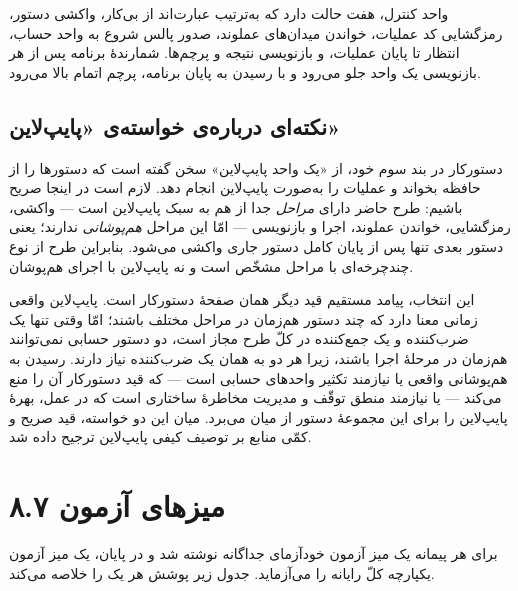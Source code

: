 \documentclass[12pt,a4paper]{article}
\begin{document}

	واحد کنترل، هفت حالت دارد که به‌ترتیب عبارت‌اند از بی‌کار، واکشی دستور، رمزگشایی کد عملیات، خواندن میدان‌های عملوند، صدور پالس شروع به واحد حساب، انتظار تا پایان عملیات، و بازنویسی نتیجه و پرچم‌ها. شمارندهٔ برنامه پس از هر بازنویسی یک واحد جلو می‌رود و با رسیدن به پایان برنامه، پرچم اتمام بالا می‌رود.


	\subsection*{نکته‌ای درباره‌ی خواسته‌ی «پایپ‌لاین»}
	دستورکار در بند سوم خود، از «یک واحد پایپ‌لاین» سخن گفته است که دستورها را از حافظه بخواند و عملیات را به‌صورت پایپ‌لاین انجام دهد. لازم است در اینجا صریح باشیم: طرح حاضر دارای \emph{مراحل} جدا از هم به سبک پایپ‌لاین است --- واکشی، رمزگشایی، خواندن عملوند، اجرا و بازنویسی --- امّا این مراحل \emph{هم‌پوشانی} ندارند؛ یعنی دستور بعدی تنها پس از پایان کامل دستور جاری واکشی می‌شود. بنابراین طرح از نوع چندچرخه‌ای با مراحل مشخّص است و نه پایپ‌لاین با اجرای هم‌پوشان.

	این انتخاب، پیامد مستقیم قید دیگر همان صفحهٔ دستورکار است. پایپ‌لاین واقعی زمانی معنا دارد که چند دستور هم‌زمان در مراحل مختلف باشند؛ امّا وقتی تنها یک ضرب‌کننده و یک جمع‌کننده در کلّ طرح مجاز است، دو دستور حسابی نمی‌توانند هم‌زمان در مرحلهٔ اجرا باشند، زیرا هر دو به همان یک ضرب‌کننده نیاز دارند. رسیدن به هم‌پوشانی واقعی یا نیازمند تکثیر واحدهای حسابی است --- که قید دستورکار آن را منع می‌کند --- یا نیازمند منطق توقّف و مدیریت مخاطرهٔ ساختاری است که در عمل، بهرهٔ پایپ‌لاین را برای این مجموعهٔ دستور از میان می‌برد. میان این دو خواسته، قید صریح و کمّی منابع بر توصیف کیفی پایپ‌لاین ترجیح داده شد.

	\section*{۸.۷ میزهای آزمون}
	برای هر پیمانه یک میز آزمون خودآزمای جداگانه نوشته شد و در پایان، یک میز آزمون یکپارچه کلّ رایانه را می‌آزماید. جدول زیر پوشش هر یک را خلاصه می‌کند.
\end{document}
